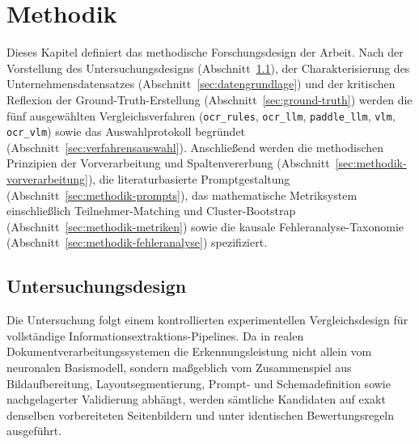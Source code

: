 \chapter{Methodik}
\label{chap:methodik}

Dieses Kapitel definiert das methodische Forschungsdesign der Arbeit. Nach der Vorstellung des Untersuchungsdesigns (Abschnitt~\ref{sec:untersuchungsdesign}), der Charakterisierung des Unternehmensdatensatzes (Abschnitt~\ref{sec:datengrundlage}) und der kritischen Reflexion der Ground-Truth-Erstellung (Abschnitt~\ref{sec:ground-truth}) werden die fünf ausgewählten Vergleichsverfahren (\texttt{ocr\_rules}, \texttt{ocr\_llm}, \texttt{paddle\_llm}, \texttt{vlm}, \texttt{ocr\_vlm}) sowie das Auswahlprotokoll begründet (Abschnitt~\ref{sec:verfahrensauswahl}). Anschließend werden die methodischen Prinzipien der Vorverarbeitung und Spaltenvererbung (Abschnitt~\ref{sec:methodik-vorverarbeitung}), die literaturbasierte Promptgestaltung (Abschnitt~\ref{sec:methodik-prompts}), das mathematische Metriksystem einschließlich Teilnehmer-Matching und Cluster-Bootstrap (Abschnitt~\ref{sec:methodik-metriken}) sowie die kausale Fehleranalyse-Taxonomie (Abschnitt~\ref{sec:methodik-fehleranalyse}) spezifiziert.

\section{Untersuchungsdesign}
\label{sec:untersuchungsdesign}

Die Untersuchung folgt einem kontrollierten experimentellen Vergleichsdesign für vollständige Informationsextraktions-Pipelines. Da in realen Dokumentverarbeitungssystemen die Erkennungsleistung nicht allein vom neuronalen Basismodell, sondern maßgeblich vom Zusammenspiel aus Bildaufbereitung, Layoutsegmentierung, Prompt- und Schemadefinition sowie nachgelagerter Validierung abhängt, werden sämtliche Kandidaten auf exakt denselben vorbereiteten Seitenbildern und unter identischen Bewertungsregeln ausgeführt.

